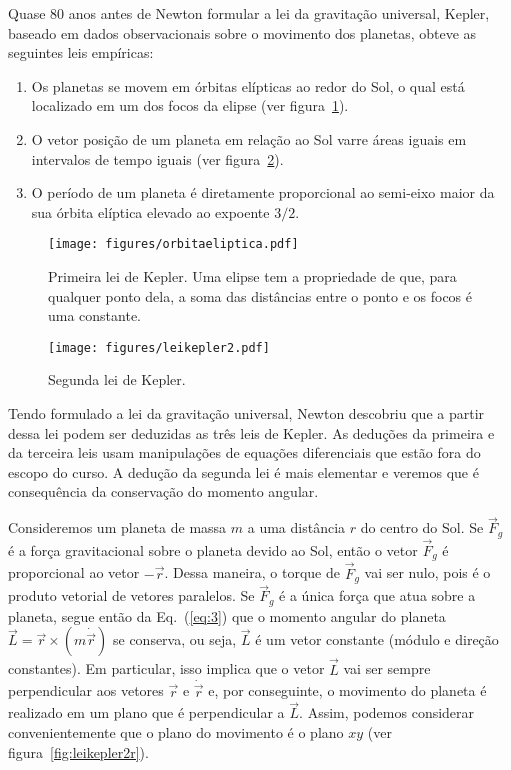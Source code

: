 \documentclass[12pt,a4paper]{article}
\theoremstyle{definition}
\begin{document}
Quase 80 anos antes de Newton formular a lei da gravitação universal,
Kepler, baseado em dados observacionais sobre o movimento dos
planetas, obteve as seguintes leis empíricas:
\begin{enumerate}
\item Os planetas se movem em órbitas elípticas ao redor do Sol, o
  qual está localizado em um dos focos da elipse (ver
  figura~\ref{fig:orbitaeliptica}).
\item O vetor posição de um planeta em relação ao Sol varre áreas
  iguais em intervalos de tempo iguais (ver
  figura~\ref{fig:leikepler2}).
\item O período de um planeta é diretamente proporcional ao semi-eixo
  maior da sua órbita elíptica elevado ao expoente $3/2$.
\end{enumerate}
\begin{figure}[t]
  \centering
  \texttt{[image: figures/orbitaeliptica.pdf]}
  \caption{Primeira lei de Kepler. Uma elipse tem a propriedade de
    que, para qualquer ponto dela, a soma das distâncias entre o ponto
    e os focos é uma constante.}
  \label{fig:orbitaeliptica}
\end{figure}
\begin{figure}[t]
  \centering
  \texttt{[image: figures/leikepler2.pdf]}
  \caption{Segunda lei de Kepler.}
  \label{fig:leikepler2}
\end{figure}

Tendo formulado a lei da gravitação universal, Newton descobriu que a
partir dessa lei podem ser deduzidas as três leis de Kepler. As
deduções da primeira e da terceira leis usam manipulações de equações
diferenciais que estão fora do escopo do curso. A dedução da segunda
lei é mais elementar e veremos que é consequência da conservação do
momento angular.

Consideremos um planeta de massa $m$ a uma distância $r$ do centro do
Sol. Se $\vec F_g$ é a força gravitacional sobre o planeta devido ao
Sol, então o vetor $\vec F_g$ é proporcional ao vetor $-\vec r$. Dessa
maneira, o torque de $\vec F_g$ vai ser nulo, pois é o produto
vetorial de vetores paralelos. Se $\vec F_g$ é a única força que atua
sobre a planeta, segue então da Eq.~(\ref{eq:3}) que o momento angular
do planeta $\vec L=\vec r\times (m\dot{\vec r})$ se conserva, ou seja,
$\vec L$ é um vetor constante (módulo e direção constantes). Em
particular, isso implica que o vetor $\vec L$ vai ser sempre
perpendicular aos vetores $\vec r$ e $\dot{\vec r}$ e, por
conseguinte, o movimento do planeta é realizado em um plano que é
perpendicular a $\vec L$. Assim, podemos considerar convenientemente
que o plano do movimento é o plano $xy$ (ver
figura~\ref{fig:leikepler2r}).
\end{document}
